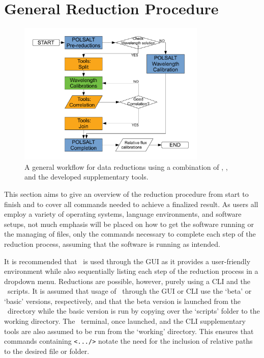 \section{General Reduction Procedure}\label{sec:red_proc}

\begin{figure}[t]
    \centering
    \includegraphics[width = 0.8\textwidth]{figures/3_new_workflow.pdf}
    \caption{A general workflow for data reductions using a combination of \polsalt, \iraf, and the developed supplementary tools.}
    \label{fig:new_workflow}
\end{figure}

This section aims to give an overview of the reduction procedure from start to finish and to cover all commands needed to achieve a finalized result. As users all employ a variety of operating systems, language environments, and software setups, not much emphasis will be placed on how to get the software running or the managing of files, only the commands necessary to complete each step of the reduction process, assuming that the software is running as intended.
\prgph

It is recommended that \polsalt\ is used through the \gls{GUI} as it provides a user-friendly environment while also sequentially listing each step of the reduction process in a dropdown menu. Reductions are possible, however, purely using a \gls{CLI} and the \polsalt\ scripts. It is assumed that usage of \polsalt\ through the \gls{GUI} or \gls{CLI} use the `beta' or `basic' versions, respectively, and that the beta version is launched from the \polsalt\ directory while the basic version is run by copying over the `scripts' folder to the working directory. The \iraf\ terminal, once launched, and the \gls{CLI} supplementary tools are also assumed to be run from the `working' directory. This ensures that commands containing \texttt{<.../>} notate the need for the inclusion of relative paths to the desired file or folder.
\prgph

